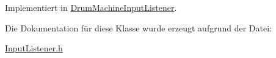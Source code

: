 Implementiert in \hyperlink{class_drum_machine_input_listener_a44a620b09b35885a26befe84fa6e1ab0}{Drum\+Machine\+Input\+Listener}.



Die Dokumentation für diese Klasse wurde erzeugt aufgrund der Datei\+:\begin{DoxyCompactItemize}
\item 
\hyperlink{_input_listener_8h}{Input\+Listener.\+h}\end{DoxyCompactItemize}
